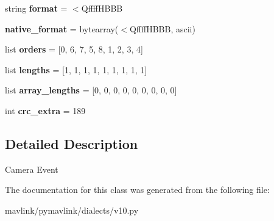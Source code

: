 \begin{DoxyCompactItemize}
\mbox{\label{classpymavlink_1_1dialects_1_1v10_1_1MAVLink__camera__status__message_aba1a310f666d639b9b8408718d090577}} 
string {\bfseries format} = \textquotesingle{}$<$Qffff\+H\+B\+BB\textquotesingle{}
\item 
\mbox{\label{classpymavlink_1_1dialects_1_1v10_1_1MAVLink__camera__status__message_aa6339341bbde83f1fff9944e84f00c38}} 
{\bfseries native\+\_\+format} = bytearray(\textquotesingle{}$<$Qffff\+H\+B\+BB\textquotesingle{}, \textquotesingle{}ascii\textquotesingle{})
\item 
\mbox{\label{classpymavlink_1_1dialects_1_1v10_1_1MAVLink__camera__status__message_a52c43064e4a95bf45f70caae97b0dfd7}} 
list {\bfseries orders} = \mbox{[}0, 6, 7, 5, 8, 1, 2, 3, 4\mbox{]}
\item 
\mbox{\label{classpymavlink_1_1dialects_1_1v10_1_1MAVLink__camera__status__message_a4a42e6b4ff58b121e63066a5273a3161}} 
list {\bfseries lengths} = \mbox{[}1, 1, 1, 1, 1, 1, 1, 1, 1\mbox{]}
\item 
\mbox{\label{classpymavlink_1_1dialects_1_1v10_1_1MAVLink__camera__status__message_a898e081820749dad8a441328e12c281c}} 
list {\bfseries array\+\_\+lengths} = \mbox{[}0, 0, 0, 0, 0, 0, 0, 0, 0\mbox{]}
\item 
\mbox{\label{classpymavlink_1_1dialects_1_1v10_1_1MAVLink__camera__status__message_a185fa608253f2d991e9fc15d00026655}} 
int {\bfseries crc\+\_\+extra} = 189
\end{DoxyCompactItemize}


\subsection{Detailed Description}
\begin{DoxyVerb}Camera Event
\end{DoxyVerb}
 

The documentation for this class was generated from the following file\+:\begin{DoxyCompactItemize}
\item 
mavlink/pymavlink/dialects/v10.\+py\end{DoxyCompactItemize}
